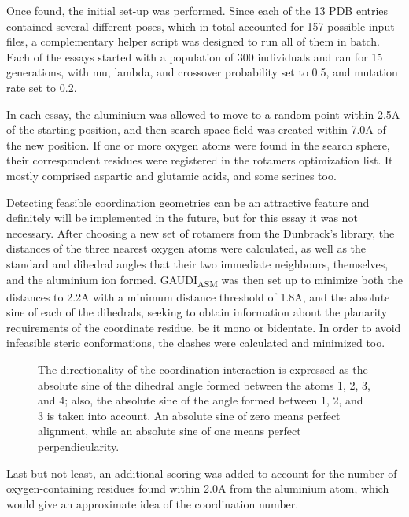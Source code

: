 Once found, the initial set-up was performed. Since each of the 13 PDB entries contained several different poses, which in total accounted for 157 possible input files, a complementary helper script was designed to run all of them in batch. Each of the essays started with a population of 300 individuals and ran for 15 generations, with mu, lambda, and crossover probability set to 0.5, and mutation rate set to 0.2.

In each essay, the aluminium was allowed to move to a random point within 2.5A of the starting position, and then search space field was created within 7.0A of the new position. If one or more oxygen atoms were found in the search sphere, their correspondent residues were registered in the rotamers optimization list. It mostly comprised aspartic and glutamic acids, and some serines too.

Detecting feasible coordination geometries can be an attractive feature and definitely will be implemented in the future, but for this essay it was not necessary. After choosing a new set of rotamers from the Dunbrack's library, the distances of the three nearest oxygen atoms were calculated, as well as the standard and dihedral angles that their two immediate neighbours, themselves, and the aluminium ion formed. GAUDI\textsubscript{ASM} was then set up to minimize both the distances to 2.2A with a minimum distance threshold of 1.8A, and the absolute sine of each of the dihedrals, seeking to obtain information about the planarity requirements of the coordinate residue, be it mono or bidentate. In order to avoid infeasible steric conformations, the clashes were calculated and minimized too.
\begin{figure}
\noindent{}
\caption[Dihedral angle calculation]{The directionality of the coordination interaction is expressed as the absolute sine of the dihedral angle formed between the atoms 1, 2, 3, and 4; also, the absolute sine of the angle formed between 1, 2, and 3 is taken into account. An absolute sine of zero means perfect alignment, while an absolute sine of one means perfect perpendicularity.}
\end{figure}

Last but not least, an additional scoring was added to account for the number of oxygen-containing residues found within 2.0A from the aluminium atom, which would give an approximate idea of the coordination number.

\vspace*{\fill}
\newpage

